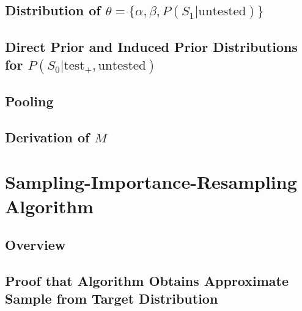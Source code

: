 \documentclass[12pt,twoside]{smiththesis}
\begin{document}
\hypertarget{distribution-of-theta-alpha-beta-ps_1textuntested}{%
\subsection{\texorpdfstring{Distribution of \(\theta = \{\alpha, \beta, P(S_1|\text{untested}) \}\)}{Distribution of \textbackslash theta = \textbackslash\{\textbackslash alpha, \textbackslash beta, P(S\_1\textbar\textbackslash text\{untested\}) \textbackslash\}}}\label{distribution-of-theta-alpha-beta-ps_1textuntested}}

\hypertarget{direct-prior-and-induced-prior-distributions-for-ps_0texttest_textuntested}{%
\subsection{\texorpdfstring{Direct Prior and Induced Prior Distributions for \(P(S_0|\text{test}_+,\text{untested})\)}{Direct Prior and Induced Prior Distributions for P(S\_0\textbar\textbackslash text\{test\}\_+,\textbackslash text\{untested\})}}\label{direct-prior-and-induced-prior-distributions-for-ps_0texttest_textuntested}}

\hypertarget{pooling}{%
\subsection{Pooling}\label{pooling}}

\hypertarget{derivation}{%
\subsection{\texorpdfstring{Derivation of \(M\)}{Derivation of M}}\label{derivation}}

\hypertarget{sampling-importance-resampling-algorithm}{%
\section{\texorpdfstring{Sampling-Importance-Resampling Algorithm \label{sampling}}{Sampling-Importance-Resampling Algorithm }}\label{sampling-importance-resampling-algorithm}}

\hypertarget{overview}{%
\subsection{Overview}\label{overview}}

\hypertarget{proof}{%
\subsection{Proof that Algorithm Obtains Approximate Sample from Target Distribution}\label{proof}}
\end{document}
